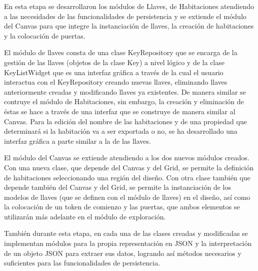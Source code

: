 En esta etapa se desarrollaron los módulos de Llaves, de Habitaciones atendiendo a las necesidades de las funcionalidades de persistencia y se extiende el módulo del Canvas para que integre la instanciación de llaves, la creación de habitaciones y la colocación de puertas.

El módulo de llaves consta de una clase KeyRepository que se encarga de la gestión de las llaves (objetos de la clase Key) a nivel lógico y de la clase KeyListWidget que es una interfaz gráfica a través de la cual el usuario interactua con el KeyRepository creando nuevas llaves, eliminando llaves anteriormente creadas y modificando llaves ya existentes.
De manera similar se contruye el módulo de Habitaciones, sin embargo, la creación y eliminación de éstas se hace a través de una interfaz que se construye de manera similar al Canvas. Para la edición del nombre de las habitaciones y de una propiedad que determinará si la habitación va a ser exportada o no, se ha desarrollado una interfaz gráfica a parte similar a la de las llaves.

El módulo del Canvas se extiende atendiendo a los dos nuevos módulos creados.
Con una nueva clase, que depende del Canvas y del Grid, se permite la definición de habitaciones seleccionando una región del diseño.
Con otra clase también que depende también del Canvas y del Grid, se permite la instanciación de los modelos de llaves (que se definen con el módulo de llaves) en el diseño, así como la colocación de un token de comienzo y las puertas, que ambos elementos se utilizarán más adelante en el módulo de exploración.

También durante esta etapa, en cada una de las clases creadas y modificadas se implementan módulos para la propia representación en JSON y la interpretación de un objeto JSON para extraer sus datos, logrando así métodos necesarios y suficientes para las funcionalidades de persistencia.